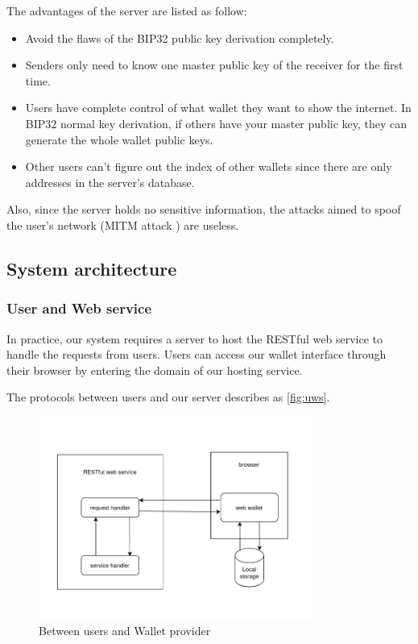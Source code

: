 The advantages of the server are listed as follow:

\begin{itemize}
    \item Avoid the flaws of the BIP32 public key derivation completely.
    \item Senders only need to know one master public key of the receiver for the first time.
    \item Users have complete control of what wallet they want to show the internet. In BIP32 normal key derivation, if others have your master public key, they can generate the whole wallet public keys.
    \item Other users can't figure out the index of other wallets since there are only addresses in the server's database.
\end{itemize}

Also, since the server holds no sensitive information, the attacks aimed to spoof the user’s network (MITM attack \cite{mitm}) are useless.



\subsection{System architecture}
\label{system_architect}

\subsubsection{User and Web service}

In practice, our system requires a server to host the RESTful web service to handle the requests from users. Users can access our wallet interface through their browser by entering the domain of our hosting service.

The protocols between users and our server describes as \autoref{fig:uws}.

\begin{figure}[!ht]
    \centering
    \includegraphics[width=0.8\textwidth]{images/design_uws.png}
    \caption[Between users and Wallet provider]{Between users and Wallet provider}
    \label{fig:uws}
\end{figure}

